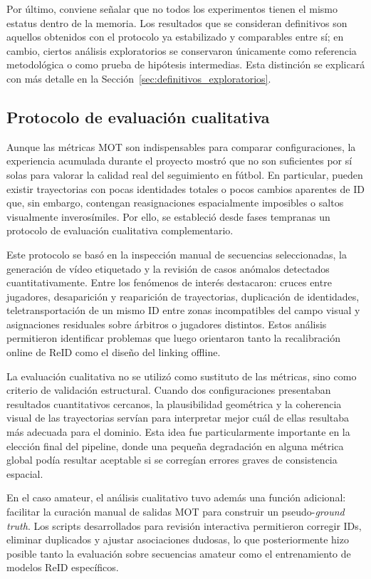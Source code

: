 \documentclass[../MAIN.tex]{subfiles}
\begin{document}
	Por último, conviene señalar que no todos los experimentos tienen el mismo estatus dentro de la memoria. Los resultados que se consideran definitivos son aquellos obtenidos con el protocolo ya estabilizado y comparables entre sí; en cambio, ciertos análisis exploratorios se conservaron únicamente como referencia metodológica o como prueba de hipótesis intermedias. Esta distinción se explicará con más detalle en la Sección~\ref{sec:definitivos_exploratorios}.
	
	\subsection{Protocolo de evaluación cualitativa}
	
	Aunque las métricas MOT son indispensables para comparar configuraciones, la experiencia acumulada durante el proyecto mostró que no son suficientes por sí solas para valorar la calidad real del seguimiento en fútbol. En particular, pueden existir trayectorias con pocas identidades totales o pocos cambios aparentes de ID que, sin embargo, contengan reasignaciones espacialmente imposibles o saltos visualmente inverosímiles. Por ello, se estableció desde fases tempranas un protocolo de evaluación cualitativa complementario.
	
	Este protocolo se basó en la inspección manual de secuencias seleccionadas, la generación de vídeo etiquetado y la revisión de casos anómalos detectados cuantitativamente. Entre los fenómenos de interés destacaron: cruces entre jugadores, desaparición y reaparición de trayectorias, duplicación de identidades, teletransportación de un mismo ID entre zonas incompatibles del campo visual y asignaciones residuales sobre árbitros o jugadores distintos. Estos análisis permitieron identificar problemas que luego orientaron tanto la recalibración online de ReID como el diseño del linking offline.
	
	La evaluación cualitativa no se utilizó como sustituto de las métricas, sino como criterio de validación estructural. Cuando dos configuraciones presentaban resultados cuantitativos cercanos, la plausibilidad geométrica y la coherencia visual de las trayectorias servían para interpretar mejor cuál de ellas resultaba más adecuada para el dominio. Esta idea fue particularmente importante en la elección final del pipeline, donde una pequeña degradación en alguna métrica global podía resultar aceptable si se corregían errores graves de consistencia espacial.
	
	En el caso amateur, el análisis cualitativo tuvo además una función adicional: facilitar la curación manual de salidas MOT para construir un pseudo-\textit{ground truth}. Los scripts desarrollados para revisión interactiva permitieron corregir IDs, eliminar duplicados y ajustar asociaciones dudosas, lo que posteriormente hizo posible tanto la evaluación sobre secuencias amateur como el entrenamiento de modelos ReID específicos.
	
\end{document}
